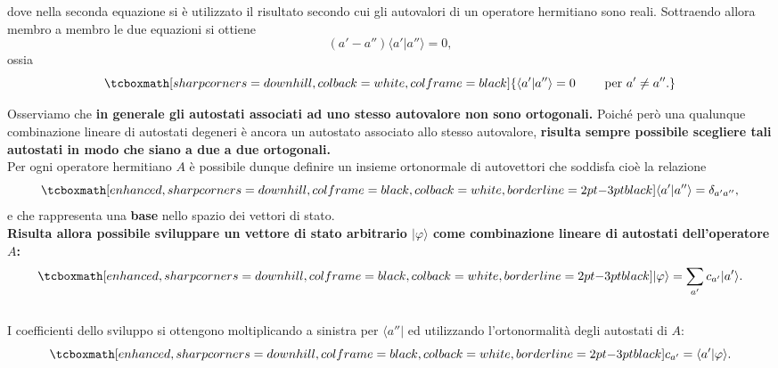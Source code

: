 \documentclass[a4paper,12pt,oneside]{book}
\begin{document}
\begin{enumerate}
\begin{equation}
	\end{equation}
dove nella seconda equazione si è utilizzato il risultato secondo cui gli autovalori di un operatore hermitiano sono reali. Sottraendo allora membro a membro le due equazioni si ottiene
	\begin{equation}
		(a'-a'') \langle a' \vert a'' \rangle =0,
	\end{equation}
ossia
	\begin{equation}
		\tcboxmath[sharp corners=downhill, colback=white, colframe=black]{
		\langle a' \vert a'' \rangle =0 \qquad \textrm{ per } a' \neq a'' .
		}
	\end{equation}
\end{enumerate}

Osserviamo che \textbf{in generale gli autostati associati ad uno stesso autovalore non sono ortogonali.} Poiché però una qualunque combinazione lineare di autostati degeneri è ancora un autostato associato allo stesso autovalore, \textbf{risulta sempre possibile scegliere tali autostati in modo che siano a due a due ortogonali.}\\

Per ogni operatore hermitiano $A$ è possibile dunque definire un insieme ortonormale di autovettori che soddisfa cioè la relazione 
	\begin{equation}
		\tcboxmath[enhanced, sharp corners=downhill, colframe=black, colback=white, borderline={2pt}{-3pt}{black}]{
			\langle a' \vert a'' \rangle = \delta _{a' a''},
			}
	\end{equation}
e che rappresenta una \textbf{base} nello spazio dei vettori di stato.\\

\textbf{Risulta allora possibile sviluppare un vettore di stato arbitrario $\vert \varphi \rangle $ come combinazione lineare di autostati dell'operatore $A$:}
	\begin{equation}
		\tcboxmath[enhanced, sharp corners=downhill, colframe=black, colback=white, borderline={2pt}{-3pt}{black}]{
			\vert \varphi \rangle = \sum _{a'} c_{a'} \vert a' \rangle .
			}
	\end{equation}
\\

I coefficienti dello sviluppo si ottengono moltiplicando  a sinistra per $\langle a'' \vert $ ed utilizzando l'ortonormalità degli autostati di $A$:
	\begin{equation}
		\tcboxmath[enhanced, sharp corners=downhill, colframe=black, colback=white, borderline={2pt}{-3pt}{black}]{
			c_{a'} = \langle a' \vert \varphi \rangle .
			}
	\end{equation}
	\\
	
\end{document}
